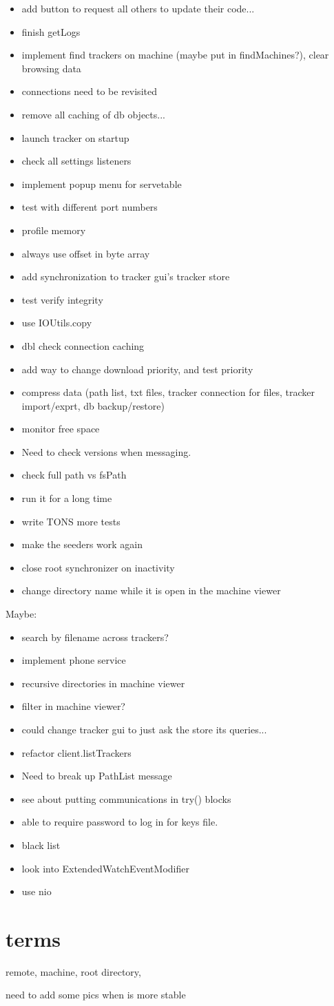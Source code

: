 \documentclass{article}
\begin{document}
\begin{itemize}
\item add button to request all others to update their code...
\item finish getLogs
\item implement find trackers on machine (maybe put in findMachines?), clear browsing data
\item connections need to be revisited
\item remove all caching of db objects...
\item launch tracker on startup
\item check all settings listeners
\item implement popup menu for servetable
\item test with different port numbers
\item profile memory
\item always use offset in byte array
\item add synchronization to tracker gui's tracker store
\item test verify integrity
\item use IOUtils.copy
\item dbl check connection caching
\item add way to change download priority, and test priority
\item compress data (path list, txt files, tracker connection for files, tracker import/exprt, db backup/restore)
\item monitor free space
\item Need to check versions when messaging.
\item check full path vs fsPath
\item run it for a long time
\item write TONS more tests
\item make the seeders work again

\item close root synchronizer on inactivity
\item change directory name while it is open in the machine viewer
\end{itemize}
Maybe:
\begin{itemize}
\item search by filename across trackers?
\item implement phone service
\item recursive directories in machine viewer
\item filter in machine viewer?
\item could change tracker gui to just ask the store its queries...
\item refactor client.listTrackers
\item Need to break up PathList message
\item see about putting communications in try() {} blocks
\item able to require password to log in for keys file.
\item black list
\item look into ExtendedWatchEventModifier
\item use nio
\end{itemize}


\section{terms}
remote, machine, root directory, 

need to add some pics when is more stable
\end{document}

